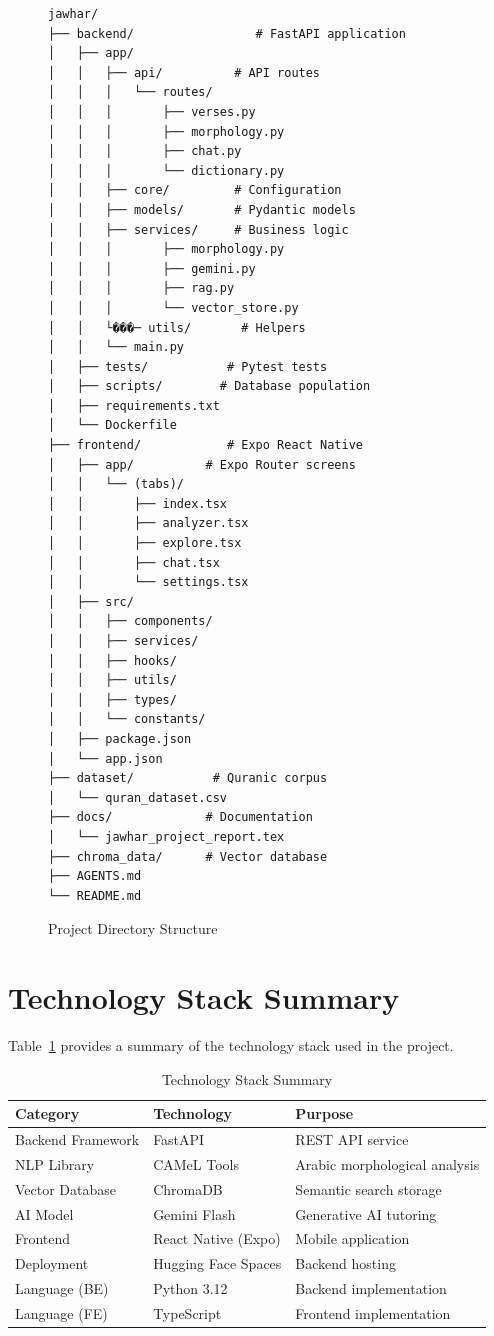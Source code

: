 \documentclass[11pt, a4paper]{article}
\begin{document}
\begin{figure}[H]
\centering
\caption{Project Directory Structure}
\label{fig:directory-structure}
\begin{scriptsize}
\begin{verbatim}
jawhar/
├── backend/                 # FastAPI application
│   ├── app/
│   │   ├── api/          # API routes
│   │   │   └── routes/
│   │   │       ├── verses.py
│   │   │       ├── morphology.py
│   │   │       ├── chat.py
│   │   │       └── dictionary.py
│   │   ├── core/         # Configuration
│   │   ├── models/       # Pydantic models
│   │   ├── services/     # Business logic
│   │   │       ├── morphology.py
│   │   │       ├── gemini.py
│   │   │       ├── rag.py
│   │   │       └── vector_store.py
│   │   └���─ utils/       # Helpers
│   │   └── main.py
│   ├── tests/           # Pytest tests
│   ├── scripts/        # Database population
│   ├── requirements.txt
│   └── Dockerfile
├── frontend/            # Expo React Native
│   ├── app/          # Expo Router screens
│   │   └── (tabs)/
│   │       ├── index.tsx
│   │       ├── analyzer.tsx
│   │       ├── explore.tsx
│   │       ├── chat.tsx
│   │       └── settings.tsx
│   ├── src/
│   │   ├── components/
│   │   ├── services/
│   │   ├── hooks/
│   │   ├── utils/
│   │   ├── types/
│   │   └── constants/
│   ├── package.json
│   └── app.json
├── dataset/           # Quranic corpus
│   └── quran_dataset.csv
├── docs/             # Documentation
│   └── jawhar_project_report.tex
├── chroma_data/      # Vector database
├── AGENTS.md
└── README.md
\end{verbatim}
\end{scriptsize}
\end{figure}

\section{Technology Stack Summary}

Table~\ref{tab:tech-stack} provides a summary of the technology stack used in the project.

\begin{table}[H]
\caption{Technology Stack Summary}
\label{tab:tech-stack}
\begin{tabular}{|l|l|p{5cm}|}
\toprule
\textbf{Category} & \textbf{Technology} & \textbf{Purpose} \\
\midrule
Backend Framework & FastAPI & REST API service \\
NLP Library & CAMeL Tools & Arabic morphological analysis \\
Vector Database & ChromaDB & Semantic search storage \\
AI Model & Gemini Flash & Generative AI tutoring \\
Frontend & React Native (Expo) & Mobile application \\
Deployment & Hugging Face Spaces & Backend hosting \\
Language (BE) & Python 3.12 & Backend implementation \\
Language (FE) & TypeScript & Frontend implementation \\
\bottomrule
\end{tabular}
\end{table}
\end{document}
